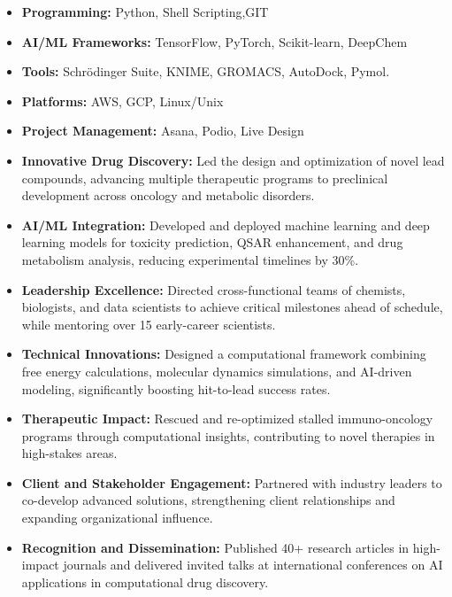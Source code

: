 \documentclass[10pt,a4paper,ragged2e,withhyper]{altacv}
\begin{document}
\begin{itemize}
    \item \textbf{Programming:} Python, Shell Scripting,GIT 
    \item \textbf{AI/ML Frameworks:} TensorFlow, PyTorch, Scikit-learn, DeepChem
    \item \textbf{Tools:} Schrödinger Suite, KNIME, GROMACS, AutoDock, Pymol.
    \item \textbf{Platforms:} AWS, GCP, Linux/Unix
    \item \textbf{Project Management:} Asana, Podio, Live Design
\end{itemize}

\begin{itemize}
    \item \textbf{Innovative Drug Discovery:} Led the design and optimization of novel lead compounds, advancing multiple therapeutic programs to preclinical development across oncology and metabolic disorders.
    \item \textbf{AI/ML Integration:} Developed and deployed machine learning and deep learning models for toxicity prediction, QSAR enhancement, and drug metabolism analysis, reducing experimental timelines by 30\%.
    \item \textbf{Leadership Excellence:} Directed cross-functional teams of chemists, biologists, and data scientists to achieve critical milestones ahead of schedule, while mentoring over 15 early-career scientists.
    \item \textbf{Technical Innovations:} Designed a computational framework combining free energy calculations, molecular dynamics simulations, and AI-driven modeling, significantly boosting hit-to-lead success rates.
    \item \textbf{Therapeutic Impact:} Rescued and re-optimized stalled immuno-oncology programs through computational insights, contributing to novel therapies in high-stakes areas.
    \item \textbf{Client and Stakeholder Engagement:} Partnered with industry leaders to co-develop advanced solutions, strengthening client relationships and expanding organizational influence.
    \item \textbf{Recognition and Dissemination:} Published 40+ research articles in high-impact journals and delivered invited talks at international conferences on AI applications in computational drug discovery.
\end{itemize}
\end{document}
